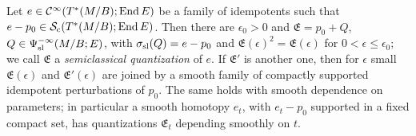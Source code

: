 \begin{proposition}\label{scindex:prop:quantize}
  Let $e\in\mathcal{C}^\infty(T^*(M/B);\operatorname{End} E)$ be a family of idempotents such that $e-p_0\in
  \mathcal{S}_{\mathrm c}(T^*(M/B);\operatorname{End} E)$. Then there are $\epsilon_0>0$ and $\mathfrak E=p_0+Q$,
  $Q\in\Psi^{-\infty}_{\mathrm{sl}}(M/B;E)$, with $\sigma_{\mathrm{sl}}(Q)=e-p_0$ and $\mathfrak E(\epsilon)^2
  =\mathfrak E(\epsilon)$ for $0<\epsilon\le\epsilon_0$; we call $\mathfrak E$ a
  \emph{semiclassical quantization} of $e$. If $\mathfrak E'$ is another one, then
  for $\epsilon$ small $\mathfrak E(\epsilon)$ and $\mathfrak E'(\epsilon)$ are
  joined by a smooth family of compactly supported idempotent perturbations of
  $p_0$. The same holds with smooth dependence on parameters; in particular a
  smooth homotopy $e_t$, with $e_t-p_0$ supported in a fixed compact set, has
  quantizations $\mathfrak E_t$ depending smoothly on $t$.
\end{proposition}

